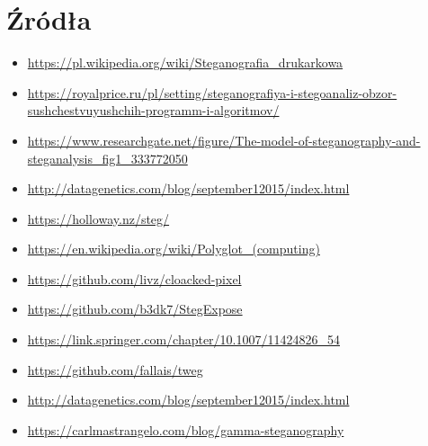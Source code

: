 \documentclass{article}
\begin{document}
\section{Źródła}
\begin{itemize}
	\item \url{https://pl.wikipedia.org/wiki/Steganografia_drukarkowa}
	\item \url{https://royalprice.ru/pl/setting/steganografiya-i-stegoanaliz-obzor-sushchestvuyushchih-programm-i-algoritmov/}
	\item \url{https://www.researchgate.net/figure/The-model-of-steganography-and-steganalysis_fig1_333772050}
	\item \url{http://datagenetics.com/blog/september12015/index.html}
	\item \url{https://holloway.nz/steg/}
	\item \url{https://en.wikipedia.org/wiki/Polyglot_(computing)}
	\item \url{https://github.com/livz/cloacked-pixel}
	\item \url{https://github.com/b3dk7/StegExpose}
	\item \url{https://link.springer.com/chapter/10.1007/11424826_54}
	\item \url{https://github.com/fallais/tweg}
	\item \url{http://datagenetics.com/blog/september12015/index.html}
	\item \url{https://carlmastrangelo.com/blog/gamma-steganography}
\end{itemize}
\end{document}
